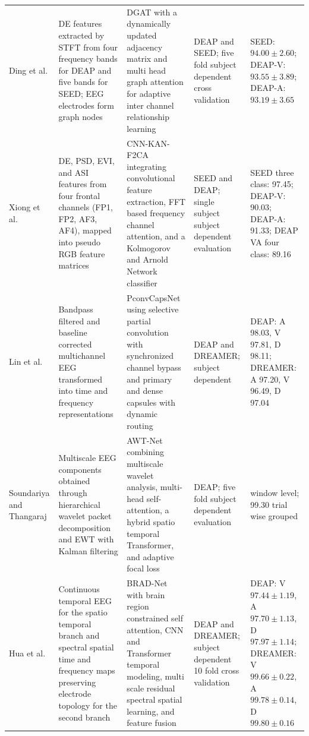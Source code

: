 \documentclass[ASNA,twocolumn]{USG}
\newcommand{\lightrowsep}{%
  \arrayrulecolor{lightrowgray}%
  \specialrule{0.30pt}{3.5pt}{3.5pt}%
  \arrayrulecolor{black}%
}
\begin{document}
\begin{table}
\begin{tabularx}{\textheight}{
>{\raggedright\arraybackslash}p{3.15cm}
>{\raggedright\arraybackslash}X
>{\raggedright\arraybackslash}X
>{\raggedright\arraybackslash}p{3.65cm}
>{\raggedright\arraybackslash}p{5.15cm}}
\lightrowsep

Ding et al. \cite{ding2025dgat} &
DE features extracted by STFT from four frequency bands for DEAP and five bands for SEED;
EEG electrodes form graph nodes &
DGAT with a dynamically updated adjacency matrix and multi head graph attention
for adaptive inter channel relationship learning &
DEAP and SEED; five fold subject dependent cross validation &
SEED: $94.00 \pm 2.60$;
DEAP-V: $93.55 \pm 3.89$;
DEAP-A: $93.19 \pm 3.65$ \\

\lightrowsep

Xiong et al. \cite{xiong2025research} &
DE, PSD, EVI, and ASI features from four frontal channels
(FP1, FP2, AF3, AF4), mapped into pseudo RGB feature matrices &
CNN-KAN-F2CA integrating convolutional feature extraction,
FFT based frequency channel attention, and a Kolmogorov and Arnold Network classifier &
SEED and DEAP; single subject subject dependent evaluation &
SEED three class: 97.45;
DEAP-V: 90.03;
DEAP-A: 91.33;
DEAP VA four class: 89.16 \\

\lightrowsep

Lin et al. \cite{lin2026selective} &
Bandpass filtered and baseline corrected multichannel EEG transformed
into time and frequency representations &
PconvCapsNet using selective partial convolution with synchronized channel bypass
and primary and dense capsules with dynamic routing &
DEAP and DREAMER; subject dependent &
DEAP: A 98.03, V 97.81, D 98.11;
DREAMER: A 97.20, V 96.49, D 97.04 \\

\lightrowsep

Soundariya and Thangaraj \cite{soundariya2026modeling} &
Multiscale EEG components obtained through hierarchical wavelet packet decomposition
and EWT with Kalman filtering &
AWT-Net combining multiscale wavelet analysis, multi-head self-attention,
a hybrid spatio temporal Transformer, and adaptive focal loss &
DEAP; five fold subject dependent evaluation &
99.61 window level;
99.30 trial wise grouped \\

\lightrowsep

Hua et al. \cite{hua2026dual} &
Continuous temporal EEG for the spatio temporal branch and spectral spatial
time and frequency maps preserving electrode topology for the second branch &
BRAD-Net with brain region constrained self attention,
CNN and Transformer temporal modeling,
multi scale residual spectral spatial learning, and feature fusion &
DEAP and DREAMER; subject dependent 10 fold cross validation &
DEAP: V $97.44 \pm 1.19$, A $97.70 \pm 1.13$, D $97.97 \pm 1.14$;
DREAMER: V $99.66 \pm 0.22$, A $99.78 \pm 0.14$, D $99.80 \pm 0.16$ \\


\end{tabularx}
\end{table}
\end{document}
